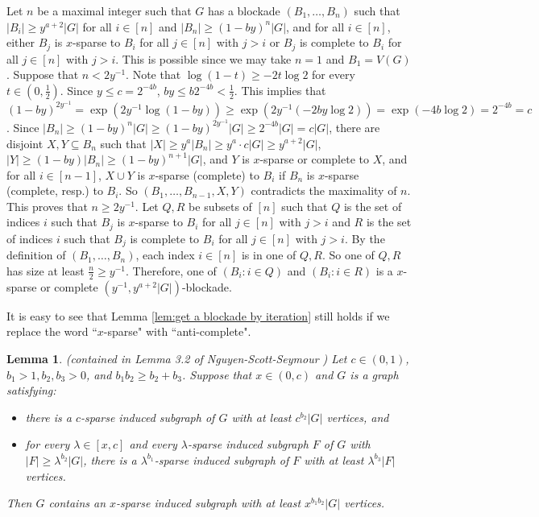 \documentclass[a4paper,11pt]{article}
\newtheorem{lemma}[theorem]{Lemma}
\let\oldendproof\endproof
\renewenvironment{proof}[1][\proofname]{%
	\oldproof[\normalfont\bfseries #1]%
}{\oldendproof}
\begin{document}
\begin{proof}[Proof of Lemma \ref{lem:get a blockade by iteration}]
    Let $n$ be a maximal integer such that $G$ has a blockade $(B_1,\ldots,B_n)$ such that $|B_{i}|\geq y^{a+2}|G|$ for all $i\in[n]$ and $|B_n|\geq (1-by)^n|G|$, and for all $i\in [n]$, either $B_j$ is $x$-sparse to $B_i$ for all $j\in[n]$ with $j>i$ or $B_j$ is complete to $B_i$ for all $j\in[n]$ with $j>i$. 
    This is possible since we may take $n=1$ and $B_1=V(G)$. 
    Suppose that $n< 2y^{-1}$. 
    Note that $\log (1-t)\geq -2t\log2$ for every $t\in (0,\frac{1}{2})$. 
    Since $y\leq c=2^{-4b}$, $by\leq b2^{-4b}<\frac{1}{2}$. 
    This implies that $(1-by)^{2y^{-1}}=\exp (2y^{-1}\log(1-by))\geq \exp (2y^{-1}(-2by\log 2))=\exp(-4b\log 2)=2^{-4b}=c$. 
    Since $|B_n|\geq (1-by)^n|G|\geq (1-by)^{2y^{-1}}|G|\geq 2^{-4b}|G|=c|G|$, there are disjoint $X,Y\subseteq B_n$ such that $|X|\geq y^a|B_n|\geq y^a\cdot c|G|\geq y^{a+2}|G|$, $|Y|\geq (1-by)|B_n|\geq (1-by)^{n+1}|G|$, and $Y$ is $x$-sparse or complete to $X$, and for all $i\in[n-1]$, $X\cup Y$ is $x$-sparse (complete) to $B_i$ if $B_n$ is $x$-sparse (complete, resp.) to $B_i$. 
    So $(B_1,\ldots,B_{n-1},X,Y)$ contradicts the maximality of $n$.
    This proves that $n\geq 2y^{-1}$.
    Let $Q,R$ be subsets of $[n]$ such that $Q$ is the set of indices $i$ such that $B_j$ is $x$-sparse to $B_i$ for all $j\in [n]$ with $j>i$ and $R$ is the set of indices $i$ such that $B_j$ is complete to $B_i$ for all $j\in [n]$ with $j>i$.
    By the definition of $(B_1,\ldots,B_n)$, each index $i\in[n]$ is in one of $Q,R$. 
    So one of $Q,R$ has size at least $\frac{n}{2}\geq y^{-1}$.
    Therefore, one of $(B_i:i\in Q)$ and $(B_i:i\in R)$ is a $x$-sparse or complete $(y^{-1},y^{a+2}|G|)$-blockade.
\end{proof}

It is easy to see that Lemma \ref{lem:get a blockade by iteration} still holds if we replace the word ``$x$-sparse"  with ``anti-complete".

\begin{lemma}\label{lem:give a more sparse subgraph 2}
\textnormal{(contained in Lemma 3.2 of Nguyen-Scott-Seymour \cite{NSS25})} 
    Let $c\in (0,1)$, $b_1>1, b_2,b_3>0$, and $b_1b_2\geq b_2+b_3$. 
    Suppose that $x\in (0,c)$ and $G$ is a graph satisfying: 
    \begin{itemize}
        \item there is a $c$-sparse induced subgraph of $G$ with at least $c^{b_2}|G|$ vertices, and 
        \item for every $\lambda\in [x,c]$ and every $\lambda$-sparse induced subgraph $F$ of $G$ with $|F|\geq \lambda^{b_2}|G|$, there is a $\lambda^{b_1}$-sparse induced subgraph of $F$ with at least $\lambda^{b_3}|F|$ vertices. 
    \end{itemize}
    Then $G$ contains an $x$-sparse induced subgraph with at least $x^{b_1b_2}|G|$ vertices. 
\end{lemma}
\end{document}
